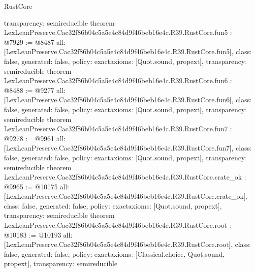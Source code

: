 \begin{lexlean}{RustCore}
\begin{coremodule}
{  transparency: semireducible
}
theorem LexLeanPreserve.Cac32f86b04c5a5e4c84d9f46beb16e4c.R39.RustCore.fun5 : @7929 := @8487 {
  all: [LexLeanPreserve.Cac32f86b04c5a5e4c84d9f46beb16e4c.R39.RustCore.fun5],
  class: false,
  generated: false,
  policy: exact{axioms: [Quot.sound, propext]},
  transparency: semireducible
}
theorem LexLeanPreserve.Cac32f86b04c5a5e4c84d9f46beb16e4c.R39.RustCore.fun6 : @8488 := @9277 {
  all: [LexLeanPreserve.Cac32f86b04c5a5e4c84d9f46beb16e4c.R39.RustCore.fun6],
  class: false,
  generated: false,
  policy: exact{axioms: [Quot.sound, propext]},
  transparency: semireducible
}
theorem LexLeanPreserve.Cac32f86b04c5a5e4c84d9f46beb16e4c.R39.RustCore.fun7 : @9278 := @9961 {
  all: [LexLeanPreserve.Cac32f86b04c5a5e4c84d9f46beb16e4c.R39.RustCore.fun7],
  class: false,
  generated: false,
  policy: exact{axioms: [Quot.sound, propext]},
  transparency: semireducible
}
theorem LexLeanPreserve.Cac32f86b04c5a5e4c84d9f46beb16e4c.R39.RustCore.crate_ok : @9965 := @10175 {
  all: [LexLeanPreserve.Cac32f86b04c5a5e4c84d9f46beb16e4c.R39.RustCore.crate_ok],
  class: false,
  generated: false,
  policy: exact{axioms: [Quot.sound, propext]},
  transparency: semireducible
}
theorem LexLeanPreserve.Cac32f86b04c5a5e4c84d9f46beb16e4c.R39.RustCore.root : @10183 := @10193 {
  all: [LexLeanPreserve.Cac32f86b04c5a5e4c84d9f46beb16e4c.R39.RustCore.root],
  class: false,
  generated: false,
  policy: exact{axioms: [Classical.choice, Quot.sound, propext]},
  transparency: semireducible
}


\end{coremodule}
\end{lexlean}
